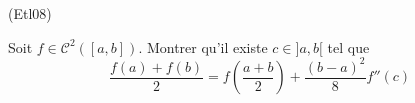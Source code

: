 \begin{tiny}(Etl08)\end{tiny} 
Soit $f\in\mathcal{C}^2([a,b])$. Montrer qu'il existe $c\in ]a,b[$ tel que
\begin{displaymath}
 \frac{f(a)+f(b)}{2}=f(\frac{a+b}{2})+\frac{(b-a)^2}{8}f''(c)
\end{displaymath}
